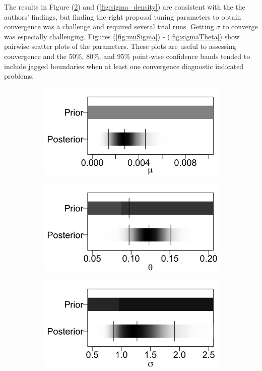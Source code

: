 \documentclass{uwstat572}
\begin{document}
The results in Figure (\ref{fig:theta_density}) and (\ref{fig:sigma_density}) are consistent with the the authors' findings, but finding the right proposal tuning parameters to obtain convergence was a challenge and required several trial runs. 
Getting $\sigma$ to converge was especially challenging. 
Figures (\ref{fig:muSigma}) - (\ref{fig:sigmaTheta}) show pairwise scatter plots of the parameters. 
These plots are useful to assessing convergence and the 50\%, 80\%, and 95\% point-wise confidence bands  tended to include jagged boundaries when at least one convergence diagnostic indicated problems. 

\begin{figure}[H]
	\centering
	\begin{subfigure}[b]{0.3\textwidth}
		\includegraphics[width=\textwidth]{figures/figure_2a.png}
		\caption{}
		\label{fig:mu_density}
	\end{subfigure}
	\hfill
	\begin{subfigure}[b]{0.3\textwidth}
		\includegraphics[width=\textwidth]{figures/figure_2b.png}
		\caption{}
		\label{fig:theta_density}
	\end{subfigure}
	\hfill
	\begin{subfigure}[b]{0.3\textwidth}
		\includegraphics[width=\textwidth]{figures/figure_2c.png}

\end{subfigure}
\end{figure}
\end{document}
